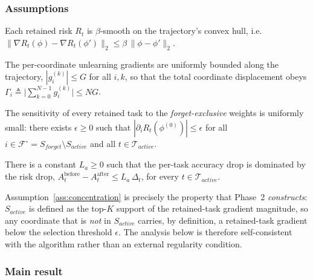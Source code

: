 \subsubsection*{Assumptions}

\begin{assumption}
\label{ass:smooth}
Each retained risk $R_{t}$ is $\beta$-smooth on the trajectory's
convex hull, i.e.
$\big\|\nabla R_{t}(\phi)-\nabla R_{t}(\phi')\big\|_{2}\le\beta\,\|\phi-\phi'\|_{2}$.
\end{assumption}

\begin{assumption}
\label{ass:bounded}
The per-coordinate unlearning gradients are uniformly bounded along
the trajectory, $|g^{(k)}_{i}|\le G$ for all $i,k$, so that the total
coordinate displacement obeys
$\Gamma_{i}\triangleq\big|\sum_{k=0}^{N-1} g^{(k)}_{i}\big|\le NG$.
\end{assumption}

\begin{assumption}
\label{ass:concentration}
The sensitivity of every retained task to the \emph{forget-exclusive}
weights is uniformly small: there exists $\epsilon\ge 0$ such that
$|\partial_{i} R_{t}(\phi^{(0)})|\le\epsilon$ for all
$i\in\mathcal{F}^{\!\circ}=S_{forget}\setminus S_{active}$ and all
$t\in\mathcal{T}_{active}$.
\end{assumption}

\begin{assumption}
\label{ass:lipschitz-acc}
There is a constant $L_{a}\ge 0$ such that the per-task accuracy drop
is dominated by the risk drop,
$A_{t}^{\text{before}}-A_{t}^{\text{after}}\le L_{a}\,\Delta_{t}$,
for every $t\in\mathcal{T}_{active}$.
\end{assumption}

\noindent
Assumption~\ref{ass:concentration} is precisely the property that
Phase~2 \emph{constructs}: $S_{active}$ is defined as the top-$K$
support of the retained-task gradient magnitude, so any coordinate
that is \emph{not} in $S_{active}$ carries, by definition, a
retained-task gradient below the selection threshold $\epsilon$. The
analysis below is therefore self-consistent with the algorithm rather
than an external regularity condition.

\subsubsection*{Main result}

